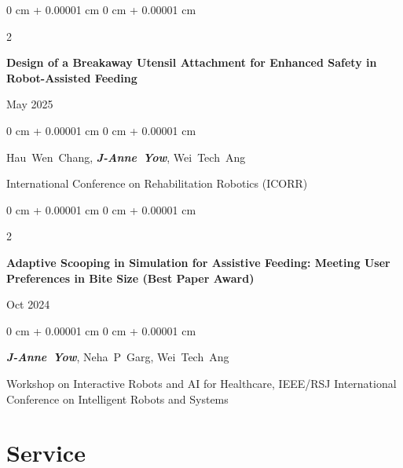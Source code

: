 \documentclass[10pt, letterpaper]{article}
\newenvironment{onecolentry}{
    \begin{adjustwidth}{
        0 cm + 0.00001 cm
    }{
        0 cm + 0.00001 cm
    }
}{
    \end{adjustwidth}
} %
\newenvironment{twocolentry}[2][]{
    \onecolentry
    \def\secondColumn{#2}
    \setcolumnwidth{\fill, 4.5 cm}
    \begin{paracol}{2}
}{
    \switchcolumn \raggedleft \secondColumn
    \end{paracol}
    \endonecolentry
} %
\begin{document}
        \vspace{0.2 cm}

        \begin{samepage}
            \begin{twocolentry}{
                May 2025
            }
                \textbf{Design of a Breakaway Utensil Attachment for Enhanced Safety in Robot-Assisted Feeding}
            \end{twocolentry}

            \vspace{0.10 cm}
            
            \begin{onecolentry}
                \mbox{Hau Wen Chang}, \mbox{\textbf{\textit{J-Anne Yow}}}, \mbox{Wei Tech Ang}

                \vspace{0.10 cm}
                
        International Conference on Rehabilitation Robotics (ICORR)\end{onecolentry}
        \end{samepage}

        \vspace{0.2 cm}

        \begin{samepage}
            \begin{twocolentry}{
                Oct 2024
            }
                \textbf{Adaptive Scooping in Simulation for Assistive Feeding: Meeting User Preferences in Bite Size (Best Paper Award)}
            \end{twocolentry}

            \vspace{0.10 cm}
            
            \begin{onecolentry}
                \mbox{\textbf{\textit{J-Anne Yow}}}, \mbox{Neha P Garg}, \mbox{Wei Tech Ang}

                \vspace{0.10 cm}
                
        Workshop on Interactive Robots and AI for Healthcare, IEEE/RSJ International Conference on Intelligent Robots and Systems\end{onecolentry}
        \end{samepage}


    
    \section{Service}
\end{document}
